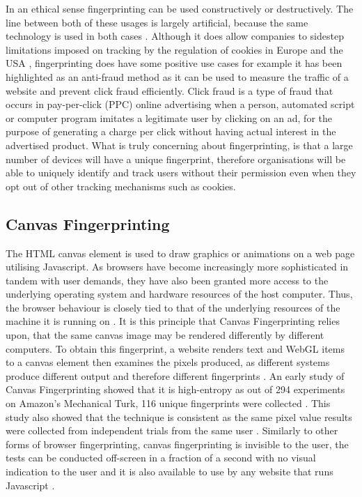 \documentclass[12pt]{article}
\begin{document}
In an ethical sense fingerprinting can be used constructively or destructively. The line between both of these usages is largely artificial, because the same technology is used in both cases \parencite{cookielessMonster}. Although it does allow companies to sidestep limitations imposed on tracking by the regulation of cookies in Europe and the USA \parencite{dustingFP}, fingerprinting does have some positive use cases for example it has been highlighted as an anti-fraud method as it can be used to measure the traffic of a website and prevent click fraud efficiently. Click fraud is a type of fraud that occurs in pay-per-click (PPC) online advertising when a person, automated script or computer program imitates a legitimate user by clicking on an ad, for the purpose of generating a charge per click without having actual interest in the advertised product. What is truly concerning about fingerprinting, is that a large number of devices will have a unique fingerprint, therefore organisations will be able to uniquely identify and track users without their permission even when they opt out of other tracking mechanisms such as cookies. 

\subsection{Canvas Fingerprinting}
The HTML canvas element is used to draw graphics or animations on a web page utilising Javascript. As browsers have become increasingly more sophisticated in tandem with user demands, they have also been granted more access to the underlying operating system and hardware resources of the host computer. Thus, the browser behaviour is closely tied to that of the underlying resources of the machine it is running on \parencite{canvasFP}. It is this principle that Canvas Fingerprinting relies upon, that the same canvas image may be rendered differently by different computers. To obtain this fingerprint, a website renders text and WebGL items to a canvas element then examines the pixels produced, as different systems produce different output and therefore different fingerprints \parencite{canvasFP}. An early study of Canvas Fingerprinting showed that it is high-entropy as out of 294 experiments on Amazon's Mechanical Turk, 116 unique fingerprints were collected \parencite{canvasFP}. This study also showed that the technique is consistent as the same pixel value results were collected from independent trials from the same user \parencite{canvasFP}. Similarly to other forms of browser fingerprinting, canvas fingerprinting is invisible to the user, the tests can be conducted off-screen in a fraction of a second with no visual indication to the user and it is also available to use by any website that runs Javascript \parencite{canvasFP}. \\
\end{document}
